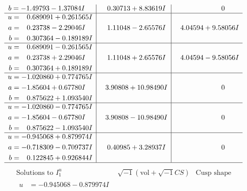 \documentclass[1p]{elsarticle_modified}
\theoremstyle{definition}
\newcommand{\I}{\sqrt{-1}}
\begin{document}
$$\begin{array}{c|c|c}
\begin{aligned}
b &= -1.49793 - 1.37084 I\end{aligned}
 & \phantom{-}0.30713 + 8.83619 I & \phantom{-0.000000 } 0 \\ \hline\begin{aligned}
u &= \phantom{-}0.689091 + 0.261565 I \\
a &= \phantom{-}0.23738 - 2.29046 I \\
b &= \phantom{-}0.307364 - 0.189189 I\end{aligned}
 & \phantom{-}1.11048 - 2.65576 I & \phantom{-}4.04594 + 9.58056 I \\ \hline\begin{aligned}
u &= \phantom{-}0.689091 - 0.261565 I \\
a &= \phantom{-}0.23738 + 2.29046 I \\
b &= \phantom{-}0.307364 + 0.189189 I\end{aligned}
 & \phantom{-}1.11048 + 2.65576 I & \phantom{-}4.04594 - 9.58056 I \\ \hline\begin{aligned}
u &= -1.020860 + 0.774765 I \\
a &= -1.85604 + 0.67780 I \\
b &= \phantom{-}0.875622 + 1.093540 I\end{aligned}
 & \phantom{-}3.90808 + 10.98490 I & \phantom{-0.000000 } 0 \\ \hline\begin{aligned}
u &= -1.020860 - 0.774765 I \\
a &= -1.85604 - 0.67780 I \\
b &= \phantom{-}0.875622 - 1.093540 I\end{aligned}
 & \phantom{-}3.90808 - 10.98490 I & \phantom{-0.000000 } 0 \\ \hline\begin{aligned}
u &= -0.945068 + 0.879974 I \\
a &= -0.718309 - 0.709737 I \\
b &= \phantom{-}0.122845 + 0.926844 I\end{aligned}
 & \phantom{-}0.40985 + 3.28937 I & \phantom{-0.000000 } 0\\
 \hline 
 \end{array}$$\newpage$$\begin{array}{c|c|c}  
\text{Solutions to }I^u_{1}& \I (\text{vol} + \sqrt{-1}CS) & \text{Cusp shape}\\
 \hline 
\begin{aligned}
u &= -0.945068 - 0.879974 I \\

\end{aligned}
\end{array}$$
\end{document}
